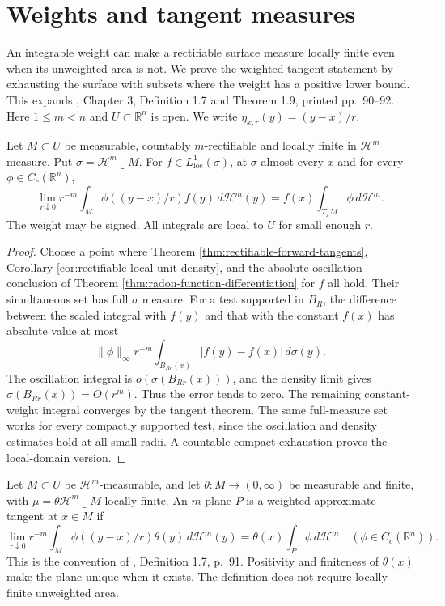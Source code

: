 \chapter{Weights and tangent measures}\label{sec:weighted-rectifiable-tangents}
An integrable weight can make a rectifiable surface measure locally finite even when its unweighted area is not. We prove the weighted tangent statement by exhausting the surface with subsets where the weight has a positive lower bound. This expands \cite{Sim18}, Chapter 3, Definition 1.7 and Theorem 1.9, printed pp.~90--92. Here $1\leq m<n$ and $U\subset\mathbb R^n$ is open. We write $\eta_{x,r}(y)=(y-x)/r$.

\begin{proposition}\label{prop:weighted-tangent-local-area}
Let $M\subset U$ be measurable, countably $m$-rectifiable and locally finite in $\mathcal H^m$ measure. Put $\sigma=\mathcal H^m\llcorner M$. For $f\in L^1_{\mathrm{loc}}(\sigma)$, at $\sigma$-almost every $x$ and for every $\phi\in C_c(\mathbb R^n)$,
\[
 \lim_{r\downarrow0}r^{-m}\int_M\phi((y-x)/r)f(y)\,d\mathcal H^m(y)
 =f(x)\int_{T_xM}\phi\,d\mathcal H^m.
\]
The weight may be signed. All integrals are local to $U$ for small enough $r$.
\end{proposition}
\begin{proof}
Choose a point where Theorem \ref{thm:rectifiable-forward-tangents}, Corollary \ref{cor:rectifiable-local-unit-density}, and the absolute-oscillation conclusion of Theorem \ref{thm:radon-function-differentiation} for $f$ all hold. Their simultaneous set has full $\sigma$ measure. For a test supported in $B_R$, the difference between the scaled integral with $f(y)$ and that with the constant $f(x)$ has absolute value at most
\[
 \|\phi\|_\infty r^{-m}\int_{B_{Rr}(x)}|f(y)-f(x)|\,d\sigma(y).
\]
The oscillation integral is $o(\sigma(B_{Rr}(x)))$, and the density limit gives $\sigma(B_{Rr}(x))=O(r^m)$. Thus the error tends to zero. The remaining constant-weight integral converges by the tangent theorem. The same full-measure set works for every compactly supported test, since the oscillation and density estimates hold at all small radii. A countable compact exhaustion proves the local-domain version.
\end{proof}

\begin{definition}\label{def:weighted-approximate-tangent}
Let $M\subset U$ be $\mathcal H^m$-measurable, and let $\theta:M\to(0,\infty)$ be measurable and finite, with $\mu=\theta\mathcal H^m\llcorner M$ locally finite. An $m$-plane $P$ is a weighted approximate tangent at $x\in M$ if
\[
 \lim_{r\downarrow0}r^{-m}\int_M\phi((y-x)/r)\theta(y)\,d\mathcal H^m(y)
 =\theta(x)\int_P\phi\,d\mathcal H^m
 \quad(\phi\in C_c(\mathbb R^n)).
\]
This is the convention of \cite{Sim18}, Definition 1.7, p.~91. Positivity and finiteness of $\theta(x)$ make the plane unique when it exists. The definition does not require locally finite unweighted area.
\end{definition}

